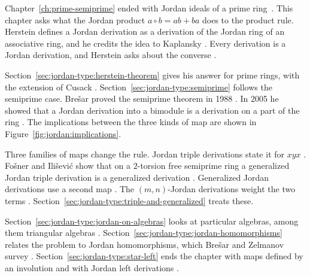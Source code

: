 
Chapter~\ref{ch:prime-semiprime} ended with Jordan ideals of a prime ring~\cite[p.~1104]{Herstein1957}.
This chapter asks what the Jordan product $a\circ b=ab+ba$ does to the product
rule. Herstein defines a Jordan derivation as a derivation of the Jordan ring
of an associative ring, and he credits the idea to Kaplansky
\cite[p.~1104]{Herstein1957}. Every derivation is a Jordan derivation, and
Herstein asks about the converse \cite[p.~1104]{Herstein1957}.

Section~\ref{sec:jordan-type:herstein-theorem} gives his answer for prime
rings, with the extension of Cusack \cite[p.~323]{Cusack1975}.
Section~\ref{sec:jordan-type:semiprime} follows the semiprime case. Brešar
proved the semiprime theorem in 1988 \cite[p.~1003]{Bresar1988}. In 2005 he
showed that a Jordan derivation into a bimodule is a derivation on a part of
the ring \cite[p.~411]{Bresar2005}. The implications between the three kinds
of map are shown in Figure~\ref{fig:jordan:implications}.

Three families of maps change the rule. Jordan triple derivations state it for
$xyx$ \cite[p.~416]{FosnerIlisevic2008}. Fošner and Ilišević show that on a
$2$-torsion free semiprime ring a generalized Jordan triple derivation is a
generalized derivation \cite[Corollary~4.2, p.~424]{FosnerIlisevic2008}.
Generalized Jordan derivations use a second map
\cite[p.~1]{FerreiraGuzzoFerreira2020}. The $(m,n)$-Jordan derivations weight
the two terms \cite[p.~1881]{MajeedOzel2014}.
Section~\ref{sec:jordan-type:triple-and-generalized} treats these.

Section~\ref{sec:jordan-type:jordan-on-algebras} looks at particular algebras,
among them triangular algebras \cite[p.~1]{ChengJing2007}.
Section~\ref{sec:jordan-type:jordan-homomorphisms} relates the problem to
Jordan homomorphisms, which Brešar and Zelmanov survey
\cite[p.~203]{BresarZelmanov2025}. Section~\ref{sec:jordan-type:star-left}
ends the chapter with maps defined by an involution
\cite[p.~416]{FosnerIlisevic2008} and with Jordan left derivations
\cite[p.~1]{Vukman1997}.

